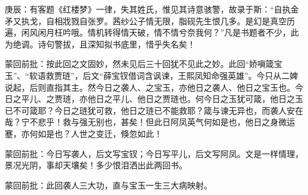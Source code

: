 
\begin{parag}

    \begin{note}庚辰：有客题《红楼梦》一律，失其姓氏，惟见其诗意骇警，故录于斯：“自执金矛又执戈，自相戕戮自张罗。茜纱公子情无限，脂砚先生恨几多。是幻是真空历遍，闲风闲月枉吟哦。情机转得情天破，情不情兮奈我何？”凡是书题者不少，此为绝调。诗句警拔，且深知拟书底里，惜乎失名矣！\end{note}
\end{parag}


\begin{parag}


    \begin{note}蒙回前批：按此回之文固妙，然未见后三十回犹不见此之妙。此回“娇嗔箴宝玉”、“软语救贾琏”，后文“薛宝钗借词含讽谏，王熙凤知命强英雄”。今只从二婢说起，后则直指其主。然今日之袭人、之宝玉，亦他日之袭人、他日之宝玉也。今日之平儿、之贾琏，亦他日之平儿、他日之贾琏也。何今日之玉犹可箴，他日之玉已不可箴耶？今日之琏犹可救，他日之琏已不能救耶？箴与谏无异也，而袭人安在哉？宁不悲乎！救与强无别也，甚矣！但此日阿凤英气何如是也，他日之身微运蹇，亦何如是也？人世之变迁，倏忽如此！\end{note}
\end{parag}


\begin{parag}


    \begin{note}蒙回前批：今日写袭人，后文写宝钗；今日写平儿，后文写阿凤。文是一样情理，景况光阴，事却天壤矣！多少恨泪洒出此两回书。\end{note}
\end{parag}


\begin{parag}


    \begin{note}蒙回前批：此回袭人三大功，直与宝玉一生三大病映射。\end{note}
\end{parag}

